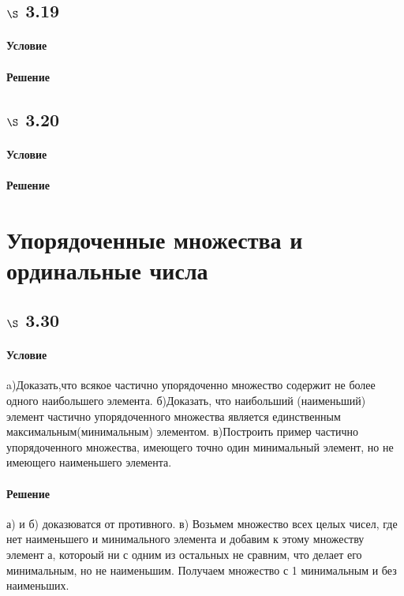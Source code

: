 \documentclass[a4paper,12pt]{article}
\begin{document}
\subsection*{$\S$ 3.19}
\paragraph*{Условие}
\paragraph*{Решение}

\subsection*{$\S$ 3.20}
\paragraph*{Условие}
\paragraph*{Решение}


\section{Упорядоченные множества и ординальные числа}
\subsection*{$\S$ 3.30}
\paragraph*{Условие}
a)Доказать,что всякое частично упорядоченно множество содержит не более одного наибольшего элемента.
б)Доказать, что наибольший (наименьший) элемент частично упорядоченного множества является единственным максимальным(минимальным) элементом.
в)Построить пример частично упорядоченного множества, имеющего точно один минимальный элемент, но не имеющего наименьшего элемента.
\paragraph*{Решение}
а) и б) доказюватся от противного.
в) Возьмем множество всех целых чисел, где нет наименьшего и минимального элемента и добавим к этому множеству элемент а, котороый ни с одним из остальных не сравним, что делает его минимальным, но не наименьшим. Получаем множество с 1 минимальным и без наименьших.
\end{document}
